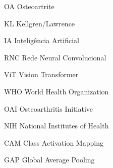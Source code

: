 \documentclass[
	12pt,					%
	openright,				%
	twoside,					%
	a4paper,					%
	english,					%
	brazil,					%
	]{abntex2}
\begin{document}
\frenchspacing

\pretextual



\imprimirfolhaderosto*

% 

% 

% 

% 

% 



\listoffigures*
\cleardoublepage

\listoftables*
\cleardoublepage

\begin{siglas}
  \item[OA] Osteoartrite
  \item[KL] Kellgren/Lawrence
  \item[IA] Inteligência Artificial
  \item[RNC] Rede Neural Convolucional
  \item[ViT] Vision Transformer
  \item[WHO] World Health Organization
  \item[OAI] Osteoarthritis Initiative
  \item[NIH] National Institutes of Health
  \item[CAM] Class Activation Mapping
  \item[GAP] Global Average Pooling
\end{siglas}

\end{document}

